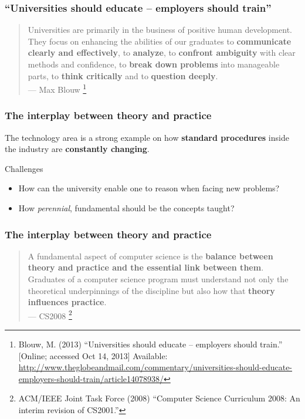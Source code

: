 \documentclass{beamer}
\begin{document}
\begin{frame}
\frametitle{``Universities should educate -- employers should train''}

\begin{quote}
Universities are primarily in the business of positive human development. They
focus on enhancing the abilities of our graduates to \textbf{communicate clearly
and effectively}, to \textbf{analyze}, to \textbf{confront ambiguity} with clear methods and
confidence, to \textbf{break down problems} into manageable parts, to \textbf{think critically}
and to \textbf{question deeply}.\\
\hfill --- \textup{Max Blouw} \footnote{\tiny Blouw, M. (2013) ``Universities should
educate -- employers should train.'' [Online; accessed Oct 14, 2013] Available:
\url{http://www.theglobeandmail.com/commentary/universities-should-educate-employers-should-train/article14078938/}}
\end{quote}

\end{frame}

\begin{frame}
\frametitle{The interplay between theory and practice}
The technology area is a strong example on how \textbf{standard procedures} inside the
industry are \textbf{constantly changing}.

\begin{block}{Challenges}
	\begin{itemize}
		\item How can the university enable one to reason when facing new
		problems?
		\item How \emph{perennial}, fundamental should be the concepts taught?
		
	\end{itemize}
\end{block}

\end{frame}

\begin{frame}
\frametitle{The interplay between theory and practice}
\begin{quote}
A fundamental aspect of computer science is the \textbf{balance between theory and
practice and the essential link between them}. Graduates of a computer science
program must understand not only the theoretical underpinnings of the discipline
but also how that \textbf{theory influences practice}. \\
\hfill --- \textup{CS2008}
\footnote{\tiny ACM/IEEE Joint Task Force (2008) ``Computer Science Curriculum
2008: An interim revision of CS2001.''}

\end{quote}
\end{frame}
\end{document}
